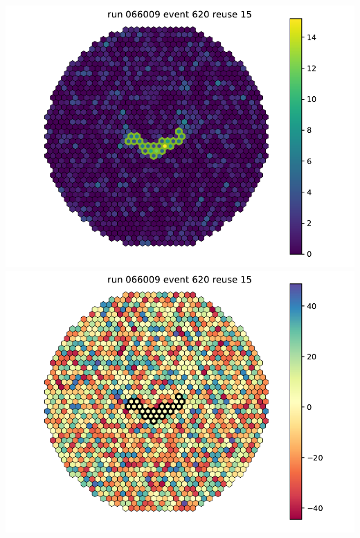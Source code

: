 \begin{withoutheadline}
\begin{frame}{}
\begin{columns}[onlytextwidth]
\begin{column}{0.33\textwidth}
        \includegraphics[width=\textwidth, page=4]{fig/camera_images/cleaning_facttools_pe_066009.pdf}
        \includegraphics[width=\textwidth, page=4]{fig/camera_images/cleaning_facttools_arrival_times_066009.pdf}
      \end{column}
    \end{columns}
  \end{frame}
\end{withoutheadline}

